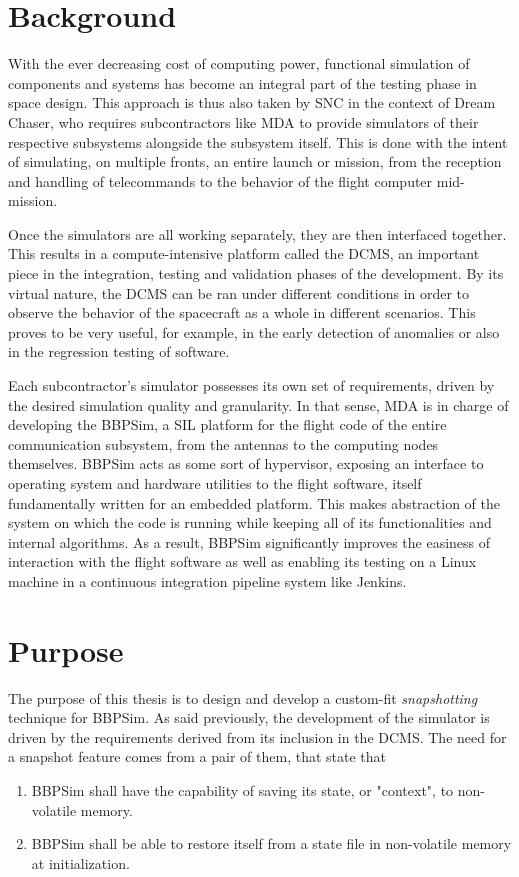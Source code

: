 \section{Background}\label{sec:intro-background}
With the ever decreasing cost of computing power, functional simulation of components and systems has become an integral part of the testing phase in space design. This approach is thus also taken by \gls{SNC} in the context of Dream Chaser, who requires subcontractors like \gls{MDA} to provide simulators of their respective subsystems alongside the subsystem itself. This is done with the intent of simulating, on multiple fronts, an entire launch or mission, from the reception and handling of telecommands to the behavior of the flight computer mid-mission. 

Once the simulators are all working separately, they are then interfaced together. This results in a compute-intensive platform called the \gls{DCMS}, an important piece in the integration, testing and validation phases of the development. By its virtual nature, the \gls{DCMS} can be ran under different conditions in order to observe the behavior of the spacecraft as a whole in different scenarios. This proves to be  very useful, for example, in the early detection of anomalies or also in the regression testing of software.

Each subcontractor's simulator possesses its own set of requirements, driven by the desired simulation quality and granularity. In that sense, \gls{MDA} is in charge of developing the \gls{BBPSim}, a \gls{SIL} platform for the flight code of the entire communication subsystem, from the antennas to the computing nodes themselves. \gls{BBPSim} acts as some sort of hypervisor, exposing an interface to operating system and hardware utilities to the flight software, itself fundamentally written for an embedded platform. This makes abstraction of the system on which the code is running while keeping all of its functionalities and internal algorithms. As a result, \gls{BBPSim} significantly improves the easiness of interaction with the flight software as well as enabling its testing on a Linux machine in a continuous integration pipeline system like Jenkins.

\section{Purpose}
The purpose of this thesis is to design and develop a custom-fit \textit{snapshotting} technique for \gls{BBPSim}. As said previously, the development of the simulator is driven by the requirements derived from its inclusion in the DCMS. The need for a snapshot feature comes from a pair of them, that state that
\begin{enumerate}
	\item \gls{BBPSim} shall have the capability of saving its state, or "context", to non-volatile memory.
	\item \gls{BBPSim} shall be able to restore itself from a state file in non-volatile memory at initialization.
\end{enumerate} 

